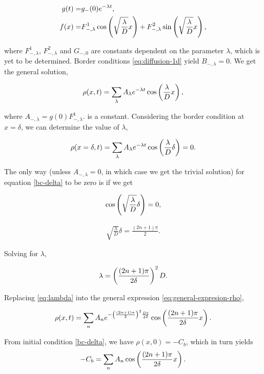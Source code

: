 \begin{align}
	g(t) =& g_{-}(0)e^{-\lambda t},\\
	f(x) =& F^1_{-,\lambda}\cos\left({{\sqrt{\frac{\lambda}{D}} x}}\right) + F^2_{-,\lambda}\sin\left({\sqrt{\frac{\lambda}{D}} x}\right),
\end{align}

where $F^1_{-,\lambda}$, $F^2_{-,\lambda}$ and $G_{-,0}$ are constants dependent on the parameter $\lambda$, which is yet to be determined. Border conditions \ref{eq:diffusion-1d} yield $B_{-,\lambda} = 0$. We get the general solution,


\begin{align}
	\rho(x,t) = \sum_{\lambda} A_\lambda e^{-\lambda t} \cos\left({\frac{\lambda}{D} x}\right),
\end{align}

where $A_{-,\lambda} = g(0)F^1_{-,\lambda}$. is a constant. Considering the border condition at $x=\delta$, we can determine the value of $\lambda$,


\begin{align}
\label{eq:general-expresion-rho}
	\rho(x=\delta,t) = \sum_{\lambda} A_\lambda e^{-\lambda t} \cos\left({\frac{\lambda}{D} \delta}\right) = 0.
\end{align}

The only way (unless $A_{-,\lambda} = 0$, in which case we get the trivial solution) for equation \ref{bc-delta} to be zero is if we get

\begin{align}\nonumber
	\cos\left({\sqrt{\frac{\lambda}{D}} \delta}\right) = 0,
\end{align}


\begin{align}
	\sqrt{\frac{\lambda}{D}} \delta = \frac{(2n+1)\pi}{2}.
\end{align}

Solving for $\lambda$,

\begin{align}
	\lambda  = \left({\frac{(2n+1)\pi}{2\delta}}\right)^2 D.
	\label{eq:lambda}
\end{align}

Replacing \ref{eq:lambda} into the general expression \ref{eq:general-expresion-rho},

\begin{align}
	\rho(x,t) = \sum_{n} A_n e^{-\left({\frac{(2n+1)\pi}{2}}\right)^2\frac{D t}{\delta^2}} \cos\left({\frac{(2n+1)\pi}{2\delta} x}\right).
	\label{bc-delta}
\end{align}

From initial condition \ref{bc-delta}, we have $\rho (x,0) = -C_b $, which in turn yields
\begin{align}
	-C_b = \sum_{n}A_n\cos\left({\frac{(2n+1)\pi}{2\delta} x}\right).
	\label{eq:general-expresion-rho-t0}
\end{align}

